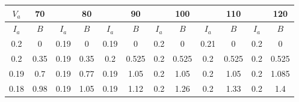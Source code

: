 \documentclass[a4paper, 14pt]{extarticle}%
\begin{document}
\begin{table}[h!]
\begin{center}
\begin{tabular}{|c|c|cc|cc|cc|cc|cc|}
\hline
\rowcolor[HTML]{9698ED} 
$V_a$ & 70     &                                                   & 80                            &                                                   & 90                          &                                                   & 100                           &                                                   & 110                          &                                                   & 120    \\ \hline
$I_a$ & $B$    & \multicolumn{1}{c|}{$I_a$}                        & $B$                           & \multicolumn{1}{c|}{$I_a$}                        & $B$                         & \multicolumn{1}{c|}{$I_a$}                        & $B$                           & \multicolumn{1}{c|}{$I_a$}                        & $B$                          & \multicolumn{1}{c|}{$I_a$}                        & $B$    \\ \hline
\rowcolor[HTML]{9698ED} 
0.2   & 0      & \multicolumn{1}{c|}{\cellcolor[HTML]{9698ED}0.19} & 0                             & \multicolumn{1}{c|}{\cellcolor[HTML]{9698ED}0.19} & 0                           & \multicolumn{1}{c|}{\cellcolor[HTML]{9698ED}0.2}  & 0                             & \multicolumn{1}{c|}{\cellcolor[HTML]{9698ED}0.21} & 0                            & \multicolumn{1}{c|}{\cellcolor[HTML]{9698ED}0.2}  & 0      \\ \hline
0.2   & 0.35   & \multicolumn{1}{c|}{0.19}                         & 0.35                          & \multicolumn{1}{c|}{0.2}                          & 0.525                       & \multicolumn{1}{c|}{0.2}                          & 0.525                         & \multicolumn{1}{c|}{0.2}                          & 0.525                        & \multicolumn{1}{c|}{0.2}                          & 0.525  \\ \hline
\rowcolor[HTML]{9698ED} 
0.19  & 0.7    & \multicolumn{1}{c|}{\cellcolor[HTML]{9698ED}0.19} & 0.77                          & \multicolumn{1}{c|}{\cellcolor[HTML]{9698ED}0.19} & 1.05                        & \multicolumn{1}{c|}{\cellcolor[HTML]{9698ED}0.2}  & 1.05                          & \multicolumn{1}{c|}{\cellcolor[HTML]{9698ED}0.2}  & 1.05                         & \multicolumn{1}{c|}{\cellcolor[HTML]{9698ED}0.2}  & 1.085  \\ \hline
0.18  & 0.98   & \multicolumn{1}{c|}{0.19}                         & 1.05                          & \multicolumn{1}{c|}{0.19}                         & 1.12                        & \multicolumn{1}{c|}{0.2}                          & 1.26                          & \multicolumn{1}{c|}{0.2}                          & 1.33                         & \multicolumn{1}{c|}{0.2}                          & 1.4    \\ \hline

\end{tabular}
\end{center}
\end{table}
\end{document}
